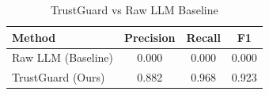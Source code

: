 \begin{table}[htbp]
\centering
\caption{TrustGuard vs Raw LLM Baseline}
\label{tab:baseline}
\begin{tabular}{lccc}
\hline
\textbf{Method} & \textbf{Precision} & \textbf{Recall} & \textbf{F1} \\
\hline
Raw LLM (Baseline) & 0.000 & 0.000 & 0.000 \\
TrustGuard (Ours)  & 0.882 & 0.968 & 0.923 \\
\hline
\end{tabular}
\end{table}